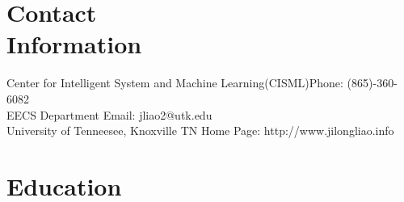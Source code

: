 \documentclass[margin,line]{resume}
\begin{document}
\begin{resume}
	\vspace{3mm}
    \section{\mysidestyle Contact\\Information}

    Center for Intelligent System and Machine Learning(CISML)\hfill Phone: (865)-360-6082  \vspace{0mm}\\\vspace{0mm}%
    EECS Department                          				 \hfill Email: jliao2@utk.edu   \vspace{0mm}\\\vspace{0mm}%
    University of Tenneesee, Knoxville TN      				 \hfill Home Page: http://www.jilongliao.info \vspace{0mm}\\\vspace{-4.5mm}%





    \section{\mysidestyle Education}


\end{resume}
\end{document}
